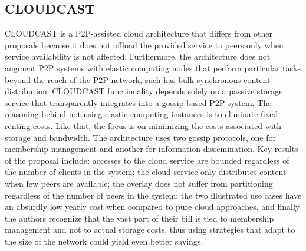 \documentclass[runningheads]{llncs}
\begin{document}
\subsection{CLOUDCAST}
CLOUDCAST \cite{cloudcast} is a P2P-assisted cloud architecture that differs from other proposals because it does not offload the provided service to peers only when service availability is not affected. Furthermore, the architecture does not augment P2P systems with elastic computing nodes that perform particular tasks beyond the reach of the P2P network, such has bulk-synchronous content distribution. CLOUDCAST functionality depends solely on a passive storage service that transparently integrates into a gossip-based P2P system. The reasoning behind not using elastic computing instances is to eliminate fixed renting costs. Like that, the focus is on minimizing the costs associated with storage and bandwidth. The architecture uses two gossip protocols, one for membership management and another for information dissemination. Key results of the proposal include: accesses to the cloud service are bounded regardless of the number of clients in the system; the cloud service only distributes content when few peers are available; the overlay does not suffer from partitioning regardless of the number of peers in the system; the two illustrated use cases have an absurdly low yearly cost when compared to pure cloud approaches, and finally the authors recognize that the vast part of their bill is tied to membership management and not to actual storage costs, thus using strategies that adapt to the size of the network could yield even better savings.
\end{document}
